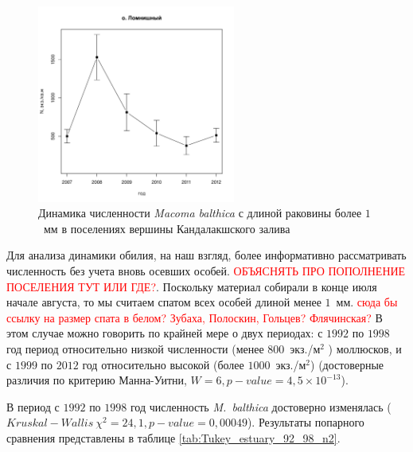 \documentclass[12pt, a4paper]{disser}
\begin{document}
\begin{figure}[h]
\begin{minipage}[b]{.46\linewidth}
\begin{center}
	\end{center}
	\end{minipage}
%
	\hfil %
%
	\begin{minipage}[b]{.46\linewidth}
	\begin{center}
		\includegraphics[width=65mm]{../White_Sea/Lomnishniy/N2_dynamic.pdf}
	\end{center}
	\end{minipage}



	\caption{Динамика численности {\it Macoma balthica} с длиной раковины более $1$~мм в поселениях вершины Кандалакшского залива}
	\label{ris:dynamic_Kandalaksha_all2}
	\end{figure}



Для анализа динамики обилия, на наш взгляд, более информативно рассматривать численность без учета вновь осевших особей. 
\textcolor{red}{ОБЪЯСНЯТЬ ПРО ПОПОЛНЕНИЕ ПОСЕЛЕНИЯ ТУТ ИЛИ ГДЕ?}. 
Поскольку материал собирали в конце июля \textemdash начале августа, то мы считаем спатом всех особей длиной менее $1$~мм. \textcolor{red}{сюда бы ссылку на размер спата в белом? Зубаха, Полоскин, Гольцев? Флячинская?} 
В этом случае можно говорить по крайней мере о двух периодах: с $1992$ по $1998$ год \textemdash период относительно низкой численности (менее $800$~экз./м$^2$ ) моллюсков, и с $1999$ по $2012$ год \textemdash относительно высокой (более $1000$~экз./м$^2$) (достоверные различия по критерию Манна-Уитни, $W = 6, p-value = 4,5 \times 10^{-13}$).

В период с $1992$ по $1998$ год численность {\it M.~balthica} достоверно изменялась ($Kruskal-Wallis\ \chi^2 = 24,1, p-value = 0,00049$). Результаты попарного сравнения представлены в таблице \ref{tab:Tukey_estuary_92_98_n2}.
\end{document}
